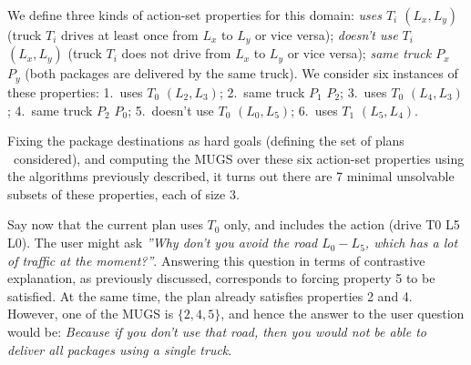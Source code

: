 We define three kinds of action-set properties for this domain:
\emph{uses $T_i$ $(L_x,L_y)$} (truck $T_i$ drives at least once from
$L_x$ to $L_y$ or vice versa); \emph{doesn't use $T_i$ $(L_x,L_y)$}
(truck $T_i$ does not drive from $L_x$ to $L_y$ or vice versa);
\emph{same truck $P_x$ $P_y$} (both packages are delivered by the same
truck). We consider six instances of these properties: 1.\ uses $T_0$
$(L_2,L_3)$; 2.\ same truck $P_1$ $P_2$; 3.\ uses $T_0$ $(L_4,L_3)$;
4.\ same truck $P_2$ $P_0$; 5.\ doesn't use $T_0$ $(L_0,L_5)$;
6.\ uses $T_1$ $(L_5,L_4)$.

Fixing the package destinations as hard goals (defining the set of
plans \plans\ considered), and computing the MUGS over these six
action-set properties using the algorithms previously described, it
turns out there are 7 minimal unsolvable subsets of these properties,
each of size 3.

Say now that the current plan uses $T_0$ only, and includes the action
(drive T0 L5 L0). The user might ask \emph{''Why don't you avoid the
  road $L_0-L_5$, which has a lot of traffic at the
  moment?''}. Answering this question in terms of contrastive
explanation, as previously discussed, corresponds to forcing property
5 to be satisfied. At the same time, the plan already satisfies
properties 2 and 4. However, one of the MUGS is $\{2,4,5\}$, and hence
the answer to the user question would be: \textit{Because if you don't
  use that road, then you would not be able to deliver all packages
  using a single truck}.
